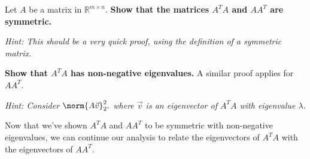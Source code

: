 \begin{enumerate}

  \qitem Let $A$ be a matrix in $\mathbb{R}^{m \times n}$. \textbf{Show that the matrices $A^T A$ and $A A^T$ are symmetric.}
  
  \textit{Hint: This should be a very quick proof, using the definition of a symmetric matrix.}
  \ws{\vspace{50px}}
  \sol{}

  \qitem \textbf{Show that $A^T A$ has non-negative eigenvalues.} A similar proof applies for $A A^T$.

  \textit{Hint: Consider $\norm{A\vec{v}}_{2}^{2}.$ where $\vec{v}$ is an eigenvector of $A^{T}A$ with eigenvalue $\lambda.$}

  \ws{\vspace{75px}}

\end{enumerate}

Now that we've shown $A^T A$ and $A A^T$ to be symmetric with non-negative eigenvalues, we can continue our analysis to relate the eigenvectors of $A^T A$ with the eigenvectors of $A A^T$.

